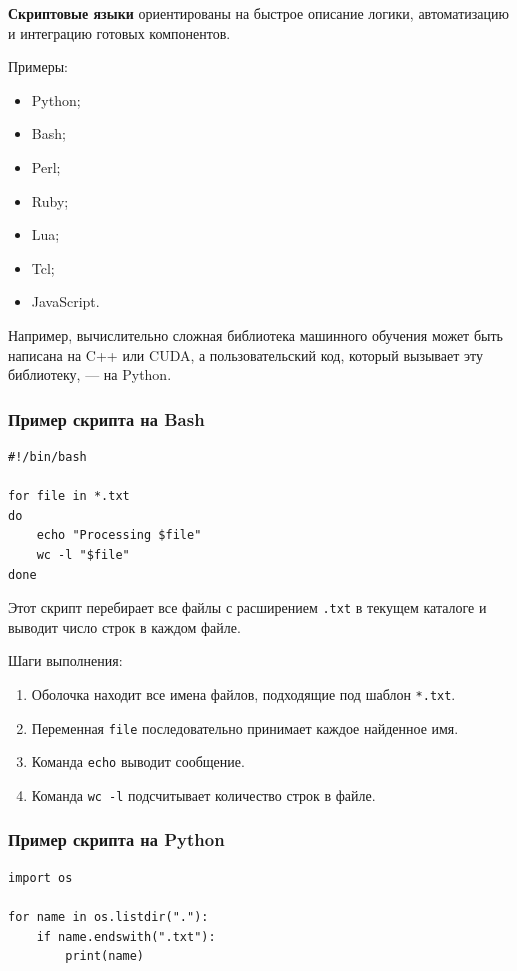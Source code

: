 \documentclass[12pt,a4paper]{article}
\begin{document}
\textbf{Скриптовые языки} ориентированы на быстрое описание логики, автоматизацию и
интеграцию готовых компонентов.

Примеры:

\begin{itemize}
    \item Python;
    \item Bash;
    \item Perl;
    \item Ruby;
    \item Lua;
    \item Tcl;
    \item JavaScript.
\end{itemize}

Например, вычислительно сложная библиотека машинного обучения может быть написана
на C++ или CUDA, а пользовательский код, который вызывает эту библиотеку, --- на
Python.

\subsubsection{Пример скрипта на Bash}

\begin{verbatim}
#!/bin/bash

for file in *.txt
do
    echo "Processing $file"
    wc -l "$file"
done
\end{verbatim}

Этот скрипт перебирает все файлы с расширением \texttt{.txt} в текущем каталоге и
выводит число строк в каждом файле.

Шаги выполнения:

\begin{enumerate}
    \item Оболочка находит все имена файлов, подходящие под шаблон \texttt{*.txt}.
    \item Переменная \texttt{file} последовательно принимает каждое найденное имя.
    \item Команда \texttt{echo} выводит сообщение.
    \item Команда \texttt{wc -l} подсчитывает количество строк в файле.
\end{enumerate}

\subsubsection{Пример скрипта на Python}

\begin{verbatim}
import os

for name in os.listdir("."):
    if name.endswith(".txt"):
        print(name)
\end{verbatim}
\end{document}
